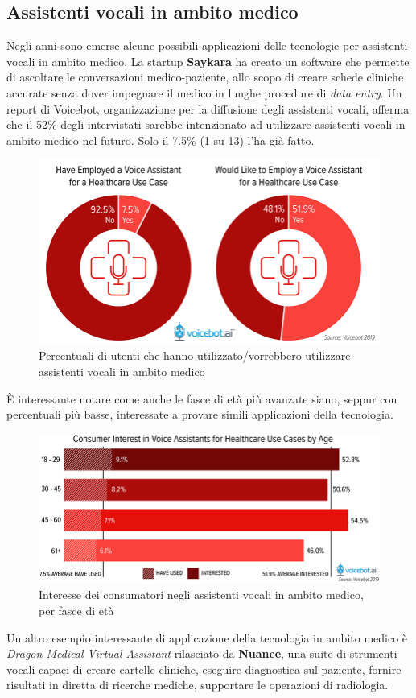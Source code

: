 \subsection{Assistenti vocali in ambito medico}
Negli anni sono emerse alcune possibili applicazioni delle tecnologie per assistenti vocali in ambito medico. La startup \textbf{Saykara} ha creato un software che permette di ascoltare le conversazioni medico-paziente, allo scopo di creare schede cliniche accurate senza dover impegnare il medico in lunghe procedure di \textit{data entry}.
Un report \cite{article:voicebot_research} di Voicebot, organizzazione per la diffusione degli assistenti vocali, afferma che il 52\% degli intervistati sarebbe intenzionato ad utilizzare assistenti vocali in ambito medico nel futuro. Solo il 7.5\% (1 su 13) l'ha già fatto.
\begin{figure}[H]
    \begin{center}
        \includegraphics[width=0.8\columnwidth]{images/voice-assistant-interest-healthcare.png}
    \end{center}
    \caption{Percentuali di utenti che hanno utilizzato/vorrebbero utilizzare assistenti vocali in ambito medico}
    \label{fig:consumer-interest}
\end{figure}
È interessante notare come anche le fasce di età più avanzate siano, seppur con percentuali più basse, interessate a provare simili applicazioni della tecnologia.
\begin{figure}[H]
    \begin{center}
        \includegraphics[width=0.8\columnwidth]{images/consumer-interest-in-voice-assistants-for-healthcare-use-cases-by-age.png}
    \end{center}
    \caption{Interesse dei consumatori negli assistenti vocali in ambito medico, per fasce di età}
    \label{fig:consumer-interest-forage}
\end{figure}
Un altro esempio interessante di applicazione della tecnologia in ambito medico è \textit{Dragon Medical Virtual Assistant} rilasciato da \textbf{Nuance}, una suite di strumenti vocali capaci di creare cartelle cliniche, eseguire diagnostica sul paziente, fornire risultati in diretta di ricerche mediche, supportare le operazioni di radiologia.
\newpage
